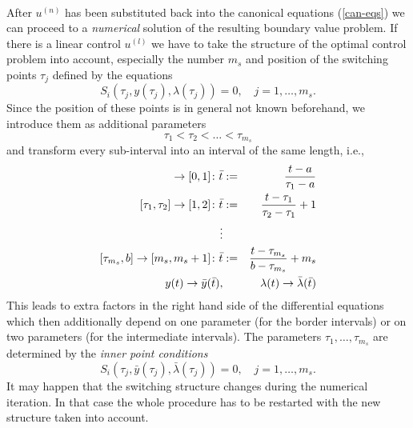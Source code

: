 \documentclass[12pt,a4paper]{article}
\begin{document}
\vspace*{3mm}
\\
After $u^{(n)}$ has been substituted back into the canonical equations
(\ref{can-eqs}) we can proceed to a {\em numerical\/} solution of the
resulting boundary value problem.  If there is a linear control
$u^{(l)}$ we have to take the structure of the optimal control problem
into account, especially the number $m_{s}$ and position of the switching
points $\tau_{j}$ defined by the equations
\begin{equation}
  S_{i}(\tau_{j},y(\tau_{j}),\lambda(\tau_{j})) = 0,\quad
   j = 1,\ldots,m_{s}.
\end{equation}
Since the position of these points is in general not known beforehand,
we introduce them as additional parameters
\begin{displaymath}
  \tau_{1} < \tau_{2} < \ldots < \tau_{m_{s}}
\end{displaymath}
and transform every sub-interval into an interval of the same length,
i.e.,
\begin{eqnarray}
         [a,\tau_{1}] \rightarrow [0,1] \colon
                 \bar t &:=& \frac{t - a}{\tau_{1} - a} \nonumber\\ \relax
  [\tau_{1},\tau_{2}] \rightarrow [1,2] \colon
                 \bar t &:=& \frac{t - \tau_{1}}{\tau_{2} - \tau_{1}} + 1 \nonumber\\ \relax
    \vdots \\ \relax
  [\tau_{m_{s}}, b] \rightarrow [m_{s},m_{s}+1] \colon
                 \bar t &:=& \frac{t - \tau_{m_{s}}}{b - \tau_{m_{s}}} + m_{s} \nonumber\\
  y(t) \rightarrow \bar y(\bar t),&& \lambda(t) \rightarrow \bar\lambda(\bar t) \nonumber
\end{eqnarray}
This leads to extra factors in the right hand side of the differential
equations which then additionally depend on one parameter (for the
border intervals) or on two parameters (for the intermediate
intervals). The parameters $\tau_{1},\ldots,\tau_{m_{s}}$ are
determined by the {\em inner point conditions}
\begin{equation}
  S_{i}(\tau_{j},\bar y(\tau_{j}),\bar \lambda(\tau_{j})) = 0,\quad
   j = 1,\ldots,m_{s}.
\end{equation}
It may happen that the switching structure changes during the
numerical iteration. In that case the whole procedure has to be
restarted with the new structure taken into account.
\end{document}

